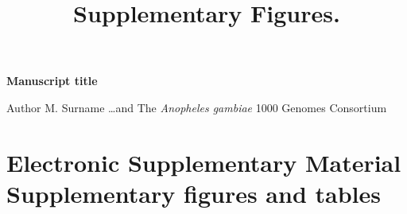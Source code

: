 \documentclass[a4paper,12pt]{article}
\title{Supplementary Figures.}
\begin{document}
\onehalfspacing

\begin{center}
	\Large
	\noindent \textbf{Manuscript title}

	\normalsize

	\vskip 3cm

\end{center}


\noindent Author M. Surname \ldots and The \textit{Anopheles gambiae} 1000 Genomes Consortium
 
\vskip 2cm 


\section*{Electronic Supplementary Material \\ Supplementary figures and tables}

\clearpage
\end{document}
